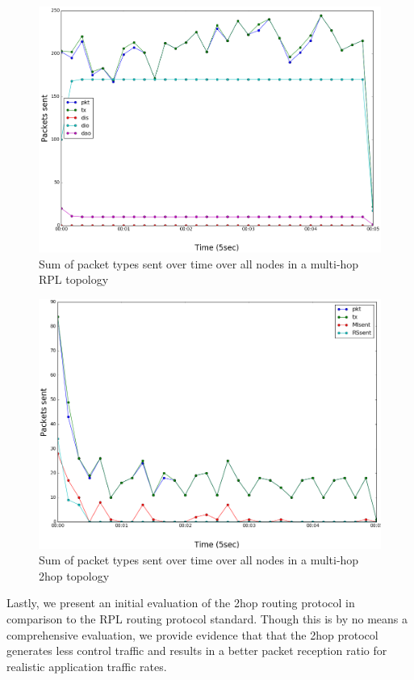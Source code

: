 \begin{figure}[t]
\centering
\includegraphics[width=\linewidth]{figs/rpl_multi_hop.png}
\caption{Sum of packet types sent over time over all nodes in a multi-hop RPL topology}
\label{fig:rpl_multi_hop}
\end{figure}

\begin{figure}[t]
\centering
\includegraphics[width=\linewidth]{figs/3hop_multi_hop.png}
\caption{Sum of packet types sent over time over all nodes in a multi-hop 2hop topology}
\label{fig:3hop_multi_hop}
\end{figure}

Lastly, we present an initial evaluation of the 2hop routing protocol in comparison to the RPL routing protocol standard.
Though this is by no means a comprehensive evaluation, we provide evidence that that the 2hop protocol generates less control traffic and results in a better packet reception ratio for realistic application traffic rates.

